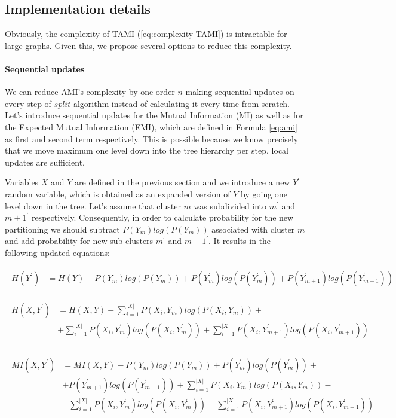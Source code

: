 \subsection{Implementation details}
Obviously, the complexity of TAMI (\ref{eq:complexity TAMI}) is intractable for large graphs. Given this, we propose several options to reduce this complexity.
\paragraph{Sequential updates}
We can reduce AMI's complexity by one order $n$ making sequential updates on every step of $split$ algorithm instead of calculating it every time from scratch. Let's introduce sequential updates for the Mutual Information (MI) as well as for the Expected Mutual Information (EMI), which are defined in Formula \ref{eq:ami} as first and second term respectively. This is possible because we know precisely that we move maximum one level down into the tree hierarchy per step, local updates are sufficient. 

Variables $X$ and $Y$ are defined in the previous section and we introduce a new $Y^{'}$ random variable, which is obtained as an expanded version of $Y$ by going one level down in the tree. Let's assume that cluster $m$ was subdivided into $m^{'}$ and ${m+1}^{'}$ respectively. Consequently, in order to calculate probability for the new partitioning we should subtract $P(Y_m)log(P(Y_m))$ associated with cluster $m$ and add probability for new sub-clusters $m^{'}$ and ${m+1}^{'}$. It results in the following updated equations:

\begin{align*}
\begin{split}
H(Y^{'}) &= H(Y) - P(Y_m)log(P(Y_m)) + P(Y_m^{'})log(P(Y_m^{'})) + P(Y_{m+1}^{'})log(P(Y_{m+1}^{'})) 
\end{split}
\end{align*}

\begin{align*}
\begin{split}
H(X, Y^{'}) &=H(X,Y)-\sum_{i=1}^{|X|}P(X_i, Y_m)log(P(X_i, Y_m))  + \\
& + \sum_{i=1}^{|X|}P(X_i, Y_m^{'})log(P(X_i, Y_m^{'})) + \sum_{i=1}^{|X|}P(X_i, Y_{m+1}^{'})log(P(X_i, Y_{m+1}^{'})) \\ 
\end{split}
\end{align*}

\begin{align*}
\begin{split}
MI(X,Y^{'}) &= MI(X,Y) - P(Y_m)log(P(Y_m)) + P(Y_m^{'})log(P(Y_m^{'})) +  \\
&  + P(Y_{m+1}^{'})log(P(Y_{m+1}^{'})) + \sum_{i=1}^{|X|}P(X_i, Y_m)log(P(X_i, Y_m)) - \\
& - \sum_{i=1}^{|X|}P(X_i, Y_m^{'})log(P(X_i, Y_m^{'})) - \sum_{i=1}^{|X|}P(X_i, Y_{m+1}^{'})log(P(X_i, Y_{m+1}^{'})) 
\end{split}
\end{align*}


